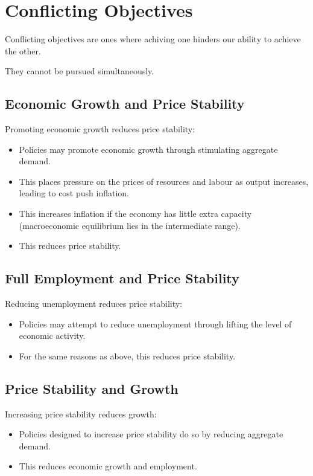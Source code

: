\documentclass[a4paper,11pt]{report}
\begin{document}
\section{Conflicting Objectives}

Conflicting objectives are ones where achiving one hinders our ability to
achieve the other.

They cannot be pursued simultaneously.

\subsection{Economic Growth and Price Stability}

Promoting economic growth reduces price stability:

\begin{itemize}
\item Policies may promote economic growth through stimulating aggregate demand.
\item This places pressure on the prices of resources and labour as output
	increases, leading to cost push inflation.
\item This increases inflation if the economy has little extra capacity
	(macroeconomic equilibrium lies in the intermediate range).
\item This reduces price stability.
\end{itemize}

\subsection{Full Employment and Price Stability}

Reducing unemployment reduces price stability:

\begin{itemize}
\item Policies may attempt to reduce unemployment through lifting the level of
	economic activity.
\item For the same reasons as above, this reduces price stability.
\end{itemize}

\subsection{Price Stability and Growth}

Increasing price stability reduces growth:

\begin{itemize}
\item Policies designed to increase price stability do so by reducing aggregate
	demand.
\item This reduces economic growth and employment.
\end{itemize}
\end{document}
